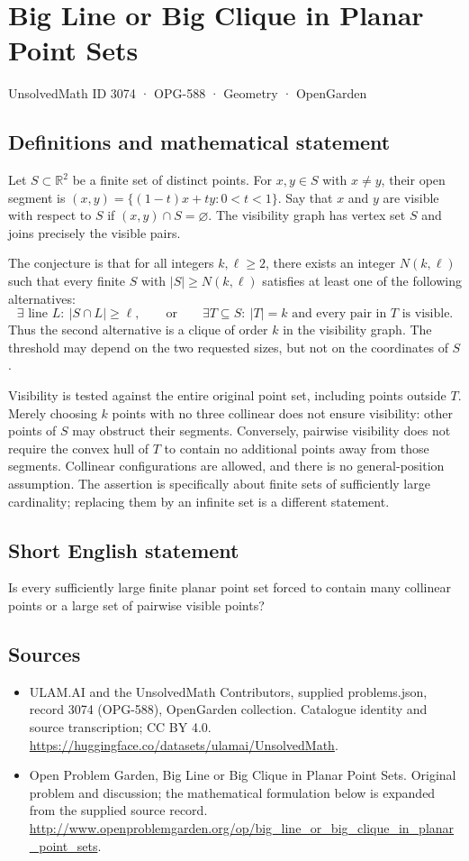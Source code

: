 \documentclass[11pt,a4paper]{article}
\begin{document}
\section*{Big Line or Big Clique in Planar Point Sets}\label{3074}
{\small UnsolvedMath ID 3074 · OPG-588 · Geometry · OpenGarden}
\subsection{Definitions and mathematical statement}
Let $S\subset\mathbb R^2$ be a finite set of distinct points. For
$x,y\in S$ with $x\ne y$, their open segment is
$(x,y)=\{(1-t)x+ty:0<t<1\}$. Say that $x$ and $y$ are visible with
respect to $S$ if $(x,y)\cap S=\varnothing$. The visibility graph has
vertex set $S$ and joins precisely the visible pairs.

The conjecture is that for all integers $k,\ell\ge2$, there exists an
integer $N(k,\ell)$ such that every finite $S$ with $|S|\ge N(k,\ell)$
satisfies at least one of the following alternatives:
\[
 \exists\text{ line }L:\ |S\cap L|\ge\ell,
 \qquad\text{or}\qquad
 \exists T\subseteq S:\ |T|=k\text{ and every pair in }T\text{ is visible}.
\]
Thus the second alternative is a clique of order $k$ in the visibility
graph. The threshold may depend on the two requested sizes, but not on
the coordinates of $S$.

Visibility is tested against the entire original point set, including
points outside $T$. Merely choosing $k$ points with no three collinear
does not ensure visibility: other points of $S$ may obstruct their
segments. Conversely, pairwise visibility does not require the convex hull
of $T$ to contain no additional points away from those segments.
Collinear configurations are allowed, and there is no general-position
assumption. The assertion is specifically about finite sets of sufficiently
large cardinality; replacing them by an infinite set is a different statement.
\subsection{Short English statement}
Is every sufficiently large finite planar point set forced to contain many collinear points or a large set of pairwise visible points?
\subsection{Sources}
\begin{itemize}
\item[S1] ULAM.AI and the UnsolvedMath Contributors, supplied problems.json, record 3074 (OPG-588), OpenGarden collection. Catalogue identity and source transcription; CC BY 4.0.
\url{https://huggingface.co/datasets/ulamai/UnsolvedMath}.
\item[S2] Open Problem Garden, Big Line or Big Clique in Planar Point Sets. Original problem and discussion; the mathematical formulation below is expanded from the supplied source record.
\url{http://www.openproblemgarden.org/op/big_line_or_big_clique_in_planar_point_sets}.
\end{itemize}
\end{document}
